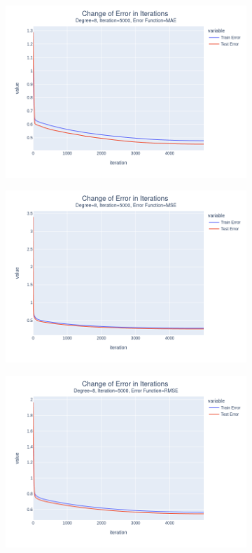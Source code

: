 \documentclass[14pt,a4]{article}
\begin{document}
\begin{figure}[h]
\begin{subfigure}{0.3\linewidth}
        \includegraphics[width=\textwidth]{images/implementation/q1/part_d/error/8_5000_MAE.png}
    \end{subfigure}
    \hfill
    \begin{subfigure}{0.3\textwidth}
        \centering
        \includegraphics[width=\textwidth]{images/implementation/q1/part_d/error/8_5000_MSE.png}
    \end{subfigure}
    \hfill
    \begin{subfigure}{0.3\linewidth}
        \centering
        \includegraphics[width=\textwidth]{images/implementation/q1/part_d/error/8_5000_RMSE.png}

\end{subfigure}
\end{figure}
\end{document}
